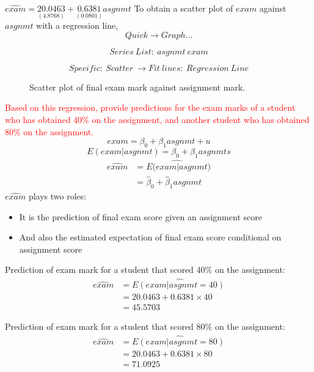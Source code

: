 \documentclass[12pt]{report}
\begin{document}
\vspace{-\baselineskip}
\centering $\widehat{exam} = \underset{(4.8768)}{20.0463} + \underset{(0.0801)}{0.6381}asgnmt$
\justify \noindent To obtain a scatter plot of $exam$ against $asgnmt$ with a regression line,
$$Quick \to Graph...$$
\begin{figure}[H]
	\centering
\end{figure}
\vspace{-\baselineskip}
$$Series\ List:\ asgnmt\ exam$$
\begin{figure}[H]
	\centering
\end{figure}
\vspace{-\baselineskip}
$$Specific:\ Scatter\ \to Fit\ lines:\ Regression\ Line$$
\begin{figure}[H]
	\centering
\end{figure}
\vspace{-\baselineskip}
\begin{figure}[H]
	\centering
	\caption{Scatter plot of final exam mark against assignment mark.}
\end{figure}
\vspace{-\baselineskip}
\noindent \textcolor{red}
{
	Based on this regression, provide predictions for the exam marks of a student who has obtained 40\% on the assignment, and another student who has obtained 80\% on the assignment.
}
$$exam = \beta_0 + \beta_1 asgnmt + u$$ $$E(exam|asgnmt) = \beta_0 + \beta_1 asgnmts$$
\begin{align*}
	\widehat{exam} &= \widehat{E(exam|asgnmt}) \\
	&= \hat{\beta}_0 + \hat{\beta}_1 asgnmt
\end{align*}
\noindent $\widehat{exam}$ plays two roles: 
\begin{itemize}
	\item It is the prediction of final exam score given an assignment score
	\item And also the estimated expectation of final exam score conditional on assignment score
\end{itemize}

\noindent Prediction of exam mark for a student that scored 40\% on the assignment:
\begin{align*}
	\widehat{exam} &= \widehat{E(exam|asgnmt = 40)} \\
	&= 20.0463 + 0.6381{\times}40 \\
	&= 45.5703
\end{align*}

\noindent Prediction of exam mark for a student that scored 80\% on the assignment:
\begin{align*}
\widehat{exam} &= \widehat{E(exam|asgnmt = 80)} \\
&= 20.0463 + 0.6381{\times}80 \\
&= 71.0925
\end{align*}
\end{document}
